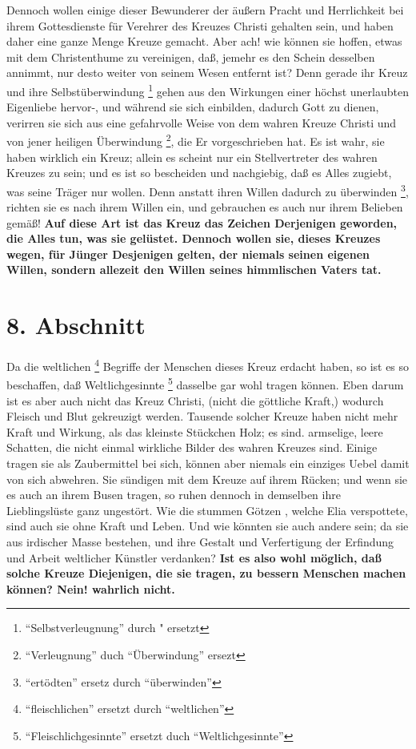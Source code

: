  Dennoch wollen einige dieser Bewunderer der äußern
Pracht und Herrlichkeit bei
ihrem Gottesdienste für Verehrer des Kreuzes Christi gehalten sein, und haben
daher eine ganze Menge Kreuze gemacht. Aber ach! wie können sie hoffen, etwas
mit dem Christenthume zu vereinigen, daß, jemehr es den Schein desselben
annimmt, nur desto weiter von seinem Wesen entfernt ist? Denn gerade ihr Kreuz
und ihre Selbstüberwindung \footnote{"`Selbstverleugnung"' durch " ersetzt}
gehen aus den Wirkungen einer höchst unerlaubten
Eigenliebe hervor-, und während sie sich einbilden, dadurch
Gott zu dienen,
verirren sie sich aus eine gefahrvolle Weise von dem wahren Kreuze Christi und
von jener heiligen Überwindung \footnote{"`Verleugnung"' duch "`Überwindung"'
ersezt}, die Er vorgeschrieben hat. Es ist wahr, sie
haben wirklich ein Kreuz; allein es scheint nur ein Stellvertreter des wahren
Kreuzes zu sein; und es ist so bescheiden und
nachgiebig, daß es Alles zugiebt,
was seine Träger nur wollen. Denn anstatt ihren Willen dadurch zu überwinden
\footnote{"`ertödten"' ersetz durch "`überwinden"'},
richten sie es nach ihrem Willen ein, und gebrauchen es auch nur ihrem Belieben
gemäß! \textbf{Auf diese Art ist das Kreuz das Zeichen Derjenigen geworden, die
Alles
tun,  was sie gelüstet. Dennoch wollen sie, dieses Kreuzes wegen, für Jünger
Desjenigen gelten, der niemals seinen eigenen Willen, sondern allezeit den
Willen seines himmlischen Vaters tat.}

\section{8. Abschnitt} \label{kap5_ab8}

 Da die weltlichen \footnote{"`fleischlichen"' ersetzt
durch "`weltlichen"'} Begriffe der Menschen dieses Kreuz erdacht haben, so ist
es
so beschaffen, daß Weltlichgesinnte \footnote{"`Fleischlichgesinnte"' ersetzt
duch "`Weltlichgesinnte"'} dasselbe gar wohl tragen können. Eben
darum ist es aber auch nicht das Kreuz Christi, (nicht die göttliche Kraft,)
wodurch Fleisch und Blut gekreuzigt werden. Tausende solcher Kreuze haben nicht
mehr Kraft und Wirkung, als das kleinste Stückchen Holz; es sind. armselige,
leere Schatten, die nicht einmal wirkliche Bilder des wahren Kreuzes sind.
Einige tragen sie als Zaubermittel bei sich, können aber niemals ein einziges
Uebel damit von sich abwehren. Sie sündigen mit dem Kreuze auf ihrem Rücken; und
wenn sie es auch an ihrem Busen tragen, so ruhen dennoch in demselben ihre
Lieblingslüste ganz ungestört. Wie die stummen Götzen , welche Elia  verspottete,
sind auch sie ohne Kraft und Leben. Und wie könnten sie auch andere sein; da sie
aus irdischer Masse bestehen, und ihre Gestalt und Verfertigung der Erfindung
und Arbeit weltlicher Künstler verdanken? \textbf{Ist es also wohl möglich, daß
solche
Kreuze Diejenigen, die sie tragen, zu bessern Menschen machen können? Nein!
wahrlich nicht.}


